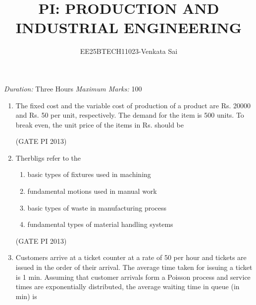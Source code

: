 \documentclass[journal,12pt,onecolumn]{IEEEtran}
\title{PI: PRODUCTION AND INDUSTRIAL ENGINEERING}
\author{EE25BTECH11023-Venkata Sai}
\theoremstyle{remark}
\begin{document}
\noindent
\maketitle
\textit{Duration:} Three Hours \hfill \textit{Maximum Marks:} 100

\begin{enumerate}

\item The fixed cost and the variable cost of production of a product are Rs. 20000 and Rs. 50 per unit, 
respectively. The demand for the item is 500 units. To break even, the unit price of the items in  
Rs. should be 

\begin{enumerate}
\end{enumerate}

\hfill (GATE PI 2013)

\item Therbligs refer to the 
\begin{enumerate}
\item basic types of fixtures used in machining
\item fundamental motions used in manual work
\item basic types of waste in manufacturing process
\item fundamental types of material handling systems 
\end{enumerate}

\hfill (GATE PI 2013)

\item Customers arrive at a ticket counter at a rate of 50 per hour and tickets are issued in the order of their 
arrival. The average time taken for issuing a ticket is 1 min. Assuming that customer arrivals form a 
Poisson process and service times are exponentially distributed, the average waiting time in queue 
(in min) is 

\begin{enumerate}
\end{enumerate}


\end{enumerate}
\end{document}
